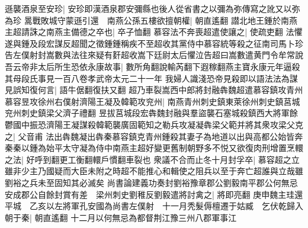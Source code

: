 遜襲酒泉至安珍|{
	安珍即漢酒泉郡安彌縣也後人從省書之以彌為弥傳寫之訛又以弥為珍}
暠戰敗城守蒙遜引還　南燕公孫五樓欲擅朝權|{
	朝直遙翻}
譛北地王鍾於南燕主超請誅之南燕主備德之卒也|{
	卒子恤翻}
慕容法不奔喪超遣使讓之|{
	使疏吏翻}
法懼遂與鍾及段宏謀反超聞之徵鍾鍾稱疾不至超收其黨侍中慕容統等殺之征南司馬卜珍告左僕射封嵩數與法往來疑有姧超收嵩下廷尉太后懼泣告超曰嵩數遣黄門令牟常說吾云帝非太后所生恐依永康故事|{
	數所角翻說輸芮翻下遐稼翻燕主寶永康元年逼殺其母段氏事見一百八卷孝武帝太元二十一年}
我婦人識淺恐帝見殺即以語法法為謀見誤知復何言|{
	語牛倨翻復扶又翻}
超乃車裂嵩西中郎將封融犇魏超遣慕容鎮攻青州慕容昱攻徐州右僕射濟陽王凝及韓範攻兖州|{
	南燕青州刺史鎮東萊徐州刺史鎮莒城兖州刺史鎮梁父濟子禮翻}
昱拔莒城段宏犇魏封融與羣盜襲石塞城殺鎮西大將軍餘鬱國中振恐濟陽王凝謀殺韓範襲廣固範知之勒兵攻凝凝犇梁父範并將其衆攻梁父克之|{
	父音甫}
法出犇魏凝出犇秦慕容鎮克青州鍾殺其妻子為地道以出與高都公始皆奔秦秦以鍾為始平太守凝為侍中南燕主超好變更舊制朝野多不悦又欲復肉刑增置烹轘之法|{
	好呼到翻更工衡翻轘戶慣翻車裂也}
衆議不合而止冬十月封孚卒|{
	慕容超之立雖非少主乃國疑而大臣未附之時超不能推心和輯使之阻兵以至于奔亡超誰與立哉雖劉裕之兵未至固知其必滅矣}
尚書論建義功奏封劉裕豫章郡公劉毅南平郡公何無忌安成郡公自餘封賞有差　梁州刺史劉稚反劉毅遣將討禽之|{
	將即亮翻}
庚申魏主珪還平城　乙亥以左將軍孔安國為尚書左僕射　十一月秃髮傉檀遷于姑臧　乞伏乾歸入朝于秦|{
	朝直遙翻}
十二月以何無忌為都督荆江豫三州八郡軍事江

